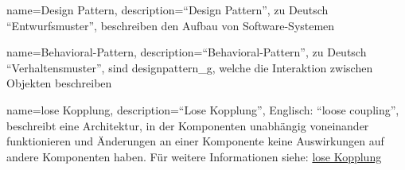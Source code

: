 
{
    name=Design Pattern,
    description={\enquote{Design Pattern}, zu Deutsch \enquote{Entwurfsmuster}, beschreiben den Aufbau von Software-Systemen}
}

{
    name=Behavioral-Pattern,
    description={\enquote{Behavioral-Pattern}, zu Deutsch \enquote{Verhaltensmuster}, sind \gls{designpattern_g}, welche die Interaktion zwischen Objekten beschreiben}
}

{
    name=lose Kopplung,
    description={\enquote{Lose Kopplung}, Englisch: \enquote{loose coupling}, beschreibt eine Architektur, in der Komponenten unabhängig voneinander funktionieren und Änderungen an einer Komponente keine Auswirkungen auf andere Komponenten haben. Für weitere Informationen siehe: \hyperref[ref:looseCoupling]{lose Kopplung}}
}